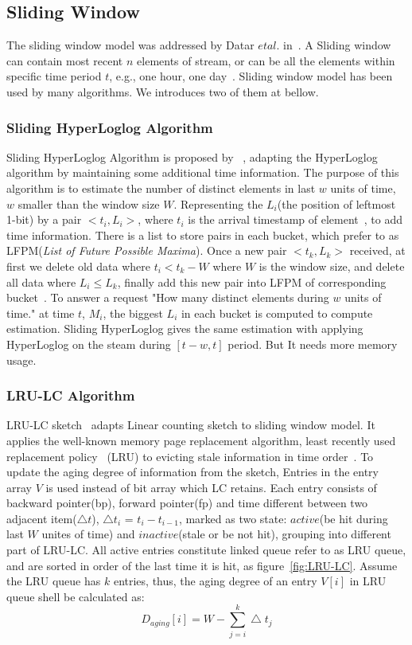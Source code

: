 \subsection{Sliding Window}
The sliding window model was addressed by Datar $et al.$
in~\cite{datar2002maintaining}. A Sliding window can contain most recent $n$
elements of stream, or can be all the elements within specific time period $t$,
e.g., one hour, one day~\cite{leskovec2014mining}. Sliding window model has been
used by many algorithms. We introduces two of them at bellow.

\subsubsection{Sliding HyperLoglog Algorithm}
Sliding HyperLoglog Algorithm is proposed by ~\cite{chabchoub2010sliding},
adapting the HyperLoglog algorithm by maintaining some additional time
information. The purpose of this algorithm is to estimate the number of distinct
elements in last $w$ units of time, $w$ smaller than the window size $W$.
Representing the $L_i$(the position of leftmost 1-bit) by a pair $<t_i, L_i>$,
where $t_i$ is the arrival timestamp of element~\cite{chabchoub2010sliding}, to
add time information. There is a list to store pairs in each bucket, which
prefer to as LFPM(\emph{List of Future Possible Maxima}). Once a new pair
$<t_k, L_k>$ received, at first we delete old data where $t_i < t_k - W$ where
$W$ is the window size, and delete all data where $L_i \leq L_k$, finally add
this new pair into LFPM of corresponding bucket~\cite{chabchoub2010sliding}. To
answer a request "How many distinct elements during $w$ units of time." at time
$t$, $M_i$, the biggest $L_i$ in each bucket is computed to compute estimation.
Sliding HyperLoglog gives the same estimation with applying HyperLoglog on the
steam during $[t-w, t]$ period. But It needs more memory usage.

\subsubsection{LRU-LC Algorithm}
LRU-LC sketch~\cite{shan2016lru} adapts Linear counting sketch to sliding window
model. It applies the well-known memory page replacement algorithm, least
recently used replacement policy~\cite{o1993lru} (LRU) to evicting stale
information in time order~\cite{shan2016lru}. To update the aging degree of
information from the sketch, Entries in the entry array $V$ is used instead of
bit array which LC retains. Each entry consists of backward pointer(bp), forward
pointer(fp) and time different between two adjacent item($\bigtriangleup t$),
$\bigtriangleup t_i$ = $t_i - t_{i-1}$, marked as two state: $active$(be hit
during last $W$ unites of time) and $inactive$(stale or be not hit), grouping
into different part of LRU-LC. All active entries constitute linked queue refer
to as LRU queue, and are sorted in order of the last time it is hit, as
figure~\ref{fig:LRU-LC}. Assume the LRU queue has $k$ entries, thus, the aging
degree of an entry $V[i]$ in LRU queue shell be calculated as:
\begin{equation*}
   D_{aging}[i] = W-\sum_{j=i}^{k}\bigtriangleup t_j
\end{equation*}

